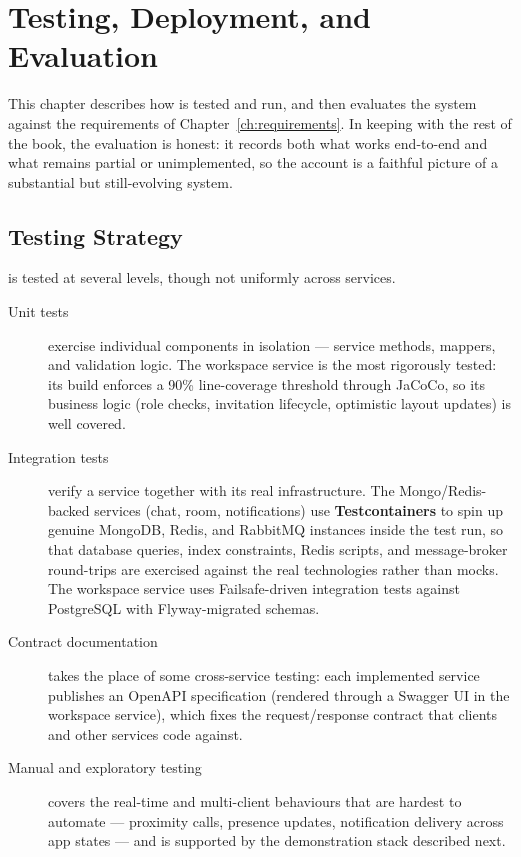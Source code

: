 \chapter{Testing, Deployment, and Evaluation}
\label{ch:testing}

This chapter describes how \voname{} is tested and run, and then evaluates the
system against the requirements of Chapter~\ref{ch:requirements}. In keeping with
the rest of the book, the evaluation is honest: it records both what works
end-to-end and what remains partial or unimplemented, so the account is a faithful
picture of a substantial but still-evolving system.

\section{Testing Strategy}

\voname{} is tested at several levels, though not uniformly across services.

\begin{description}
  \item[Unit tests] exercise individual components in isolation --- service
  methods, mappers, and validation logic. The workspace service is the most
  rigorously tested: its build enforces a 90\% line-coverage threshold through
  JaCoCo, so its business logic (role checks, invitation lifecycle, optimistic
  layout updates) is well covered.
  \item[Integration tests] verify a service together with its real
  infrastructure. The Mongo/Redis-backed services (chat, room, notifications)
  use \textbf{Testcontainers} to spin up genuine MongoDB, Redis, and RabbitMQ
  instances inside the test run, so that database queries, index constraints,
  Redis scripts, and message-broker round-trips are exercised against the real
  technologies rather than mocks. The workspace service uses Failsafe-driven
  integration tests against PostgreSQL with Flyway-migrated schemas.
  \item[Contract documentation] takes the place of some cross-service testing:
  each implemented service publishes an OpenAPI specification (rendered through a
  Swagger UI in the workspace service), which fixes the request/response contract
  that clients and other services code against.
  \item[Manual and exploratory testing] covers the real-time and multi-client
  behaviours that are hardest to automate --- proximity calls, presence updates,
  notification delivery across app states --- and is supported by the
  demonstration stack described next.
\end{description}

